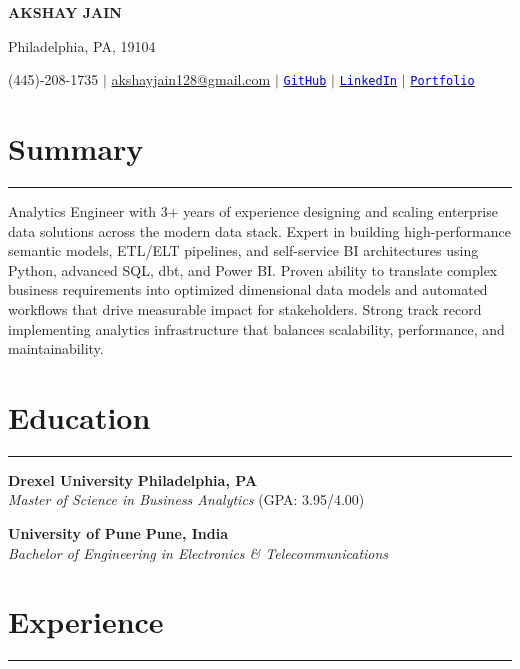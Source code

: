 \documentclass[10pt]{article}
\begin{document}
\begin{center}
    \textbf{\LARGE AKSHAY JAIN}
    
     Philadelphia, PA,  19104
    
    (445)-208-1735 $|$  
    \href{mailto:akshayjain128@gmail.com}{akshayjain128@gmail.com} $|$ \href{https://github.com/idealidler}{\textcolor{blue}{\texttt{GitHub}}} $|$ \href{https://www.linkedin.com/in/akshayjain128/}{\textcolor{blue}{\texttt{LinkedIn}}} $|$ 
    \href{https://akshay-jain-portfolio.vercel.app}{\textcolor{blue}{\texttt{Portfolio}}}
\end{center}

\section*{Summary}
\vspace{-0.25cm}
\hrule
\vspace{0.2cm}
Analytics Engineer with 3+ years of experience designing and scaling enterprise data solutions across the modern data stack. Expert in building high-performance semantic models, ETL/ELT pipelines, and self-service BI architectures using Python, advanced SQL, dbt, and Power BI. Proven ability to translate complex business requirements into optimized dimensional data models and automated workflows that drive measurable impact for stakeholders. Strong track record implementing analytics infrastructure that balances scalability, performance, and maintainability.


\section*{Education}
\vspace{-0.25cm}
\hrule
\vspace{0.2cm}
\noindent
\textbf{Drexel University} \hfill \textbf{Philadelphia, PA} \\
\textit{Master of Science in Business Analytics} (GPA: 3.95/4.00) 

\vspace{0.3cm}

\noindent
\textbf{University of Pune} \hfill \textbf{Pune, India} \\
\textit{Bachelor of Engineering in Electronics \& Telecommunications}



\vspace{-0.3cm}
\section*{Experience}
\vspace{-0.25cm}
\hrule
\vspace{0.4cm}
\end{document}
